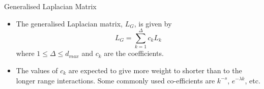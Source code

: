 \documentclass{beamer}
\begin{document}
\begin{frame}{Generalised Laplacian Matrix}
	\begin{itemize}
	\item The generalised Laplacian matrix, $L_G$, is given by
	\begin{equation}
	L_{G} = \sum_{k=1}^{\Delta} c_{k}L_{k}
	\end{equation}
	where $1 \leq \Delta \leq d_{max}$ and $c_k$ are the coefficients.
	
	\item  The values of $c_k$ are expected to give more weight to shorter than to the longer range interactions. Some commonly used co-efficients are $k^{-s}$, $e^{-\lambda k}$, etc.
	\end{itemize}
\end{frame}
\end{document}
